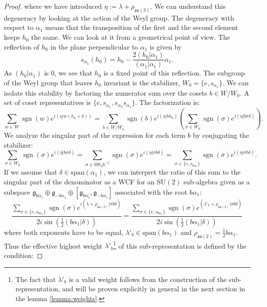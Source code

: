 \documentclass[11pt, a4paper]{article}
\DeclareMathOperator{\sgn}{sgn}
\newcommand{\su}{\mathfrak{su}}
\theoremstyle{definition}
\theoremstyle{remark}
\begin{document}
\begin{proof}
where we have introduced $\eta := \lambda + \rho_{\su(3)}$. We can understand this degeneracy by looking at the action of the Weyl group. The degeneracy with respect to $\alpha_1$ means that the transposition of the first and the second element keeps $h_0$ the same. We can look at it from a geometrical point of view. The reflection of $h_0$ in the plane perpendicular to $\alpha_1$ is given by
\[
s_{\alpha_1}(h_0) = h_0 - \frac{2(h_0|\alpha_1)}{(\alpha_1|\alpha_1)}\alpha_1.
\]
As $(h_0|\alpha_1)$ is 0, we see that $h_0$ is a fixed point of this reflection. The subgroup of the Weyl group that leaves $h_0$ invariant is the stabilizer, $W_0 = \{e, s_{\alpha_1}\}$. We can isolate this stability by factoring the numerator sum over the cosets $b \in W/W_0$. A set of coset representatives is $\{e, s_{\alpha_1}, s_{\alpha_2}s_{\alpha_1}\}$. The factorization is:
\begin{equation}
    \sum_{w \in W} \sgn(w) e^{i(\eta|w(h_0+\delta))} = \sum_{b \in W/W_0} \sgn(b) e^{i(\eta|bh_0)} \left( \sum_{\sigma \in W_0} \sgn(\sigma) e^{i(\eta|b\sigma\delta)} \right).
\end{equation}
We analyze the singular part of the expression for each term $b$ by conjugating the stabilizer:
\begin{equation}
    \sum_{\sigma \in W_0} \sgn(\sigma) e^{i(\eta|b\sigma\delta)} = \sum_{\sigma \in bW_0b^{-1}} \sgn(\sigma) e^{i(\eta|\sigma b\delta)} = \sum_{\sigma \in \{e, s_{b\alpha_1}\}} \sgn(\sigma) e^{i(\eta|\sigma b\delta)}.
\end{equation}
If we assume that $\delta\in \text{span}(\alpha_1)$, we can interpret the ratio of this sum to the singular part of the denominator as a WCF for an SU$(2)$ sub-algebra given as a subspace $\mathfrak{g}_{b\alpha_1} \oplus \mathfrak{g}_{-b\alpha_1} \oplus [\mathfrak{g}_{b\alpha_1},\mathfrak{g}_{-b\alpha_1}] $  associated with the root $b\alpha_1$:
\begin{equation}
    \frac{\sum_{\sigma \in \{e, s_{b\alpha_1}\}} \sgn(\sigma) e^{i(\lambda + \rho_{\mathfrak{su}(3)}|\sigma b\delta)}}{2i\sin\left(\frac{1}{2}(b\alpha_1|\delta)\right)} = \frac{\sum_{\sigma \in \{e, s_{b\alpha_1}\}} \sgn(\sigma) e^{(\lambda'_b+\rho_{\su(2)}|\sigma b\delta)}}{2i\sin\left(\frac{1}{2}(b\alpha_1|\delta)\right)}
\end{equation}
where both exponents have to be equal, $\lambda'_b \in \text{span} (b\alpha_1)$ and $\rho_{\su(2)}=\frac{1}{2}b\alpha_1$. Thus the effective highest weight $\lambda'_{b}$\footnote{The fact that $\lambda'_b$ is a valid weight follows from the construction of the sub-representation, and will be proven explicitly in general in the next section in the lemma \ref{lemma:weights}.} of this sub-representation is defined by the condition:


\end{proof}
\end{document}
